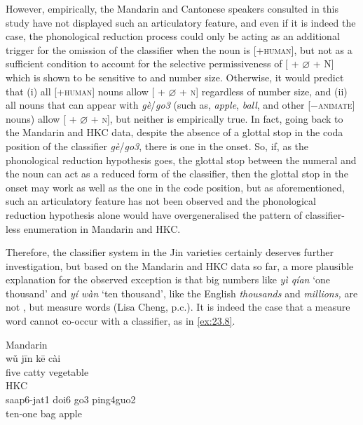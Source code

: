 \documentclass[output=paper]{langsci/langscibook}
\begin{document}
However, empirically, the Mandarin and Cantonese
speakers consulted in this study have not displayed such an articulatory
feature, and even if it is indeed the case, the phonological reduction process
could only be acting as an additional trigger for the omission of the
classifier when the noun is [+\textsc{human}], but not as a sufficient
condition to account for the selective permissiveness of [\Num{} +
$\varnothing$ + N] which is shown to be sensitive to  and number
size. Otherwise, it would predict that (i) all [+\textsc{human}] nouns allow
[\Num{} + $\varnothing$ + \textsc{n}] regardless of number size, and (ii) all
nouns that can appear with \emph{gè}/\emph{go3} (such as, \emph{apple},
\emph{ball}, and other [$-$\textsc{animate}] nouns) allow [\Num{} +
$\varnothing$ + \textsc{n}], but neither is empirically true. In fact,
going back to the Mandarin and \gls{HKC} data, despite the absence of a glottal
stop in the coda position of the classifier \emph{gè}/\emph{go3}, there is one
in the onset. So, if, as the phonological reduction hypothesis goes, the
glottal stop between the numeral and the noun can act as a reduced form of the
classifier, then the glottal stop in the onset may work as well as the one in
the code position, but as aforementioned, such an articulatory feature has not
been observed and the phonological reduction hypothesis alone would have
overgeneralised the pattern of classifier-less enumeration in Mandarin and
\gls{HKC}.

Therefore, the classifier system in the Jin varieties certainly deserves
further investigation, but based on the Mandarin and \gls{HKC} data so far, a
more plausible explanation for the observed exception is that big numbers like
\emph{yì qían} ‘one thousand’ and \emph{yí wàn} ‘ten thousand’, like the
English \emph{thousands} and \emph{millions,} are not , but
measure words (Lisa Cheng, p.c.). It is indeed the case that a measure word
cannot co-occur with a classifier, as in \eqref{ex:23.8}.

\ea\label{ex:23.8} %
	\ea Mandarin\\
    \gll * wǔ jīn kē cài\\
		{} five catty \Clf{} vegetable\\
    \ex \gls{HKC}\\%
	\gll * saap6-jat1 doi6 go3 ping4guo2\\
		{} ten-one bag \Clf{} apple\\
	\z
\z
\end{document}
